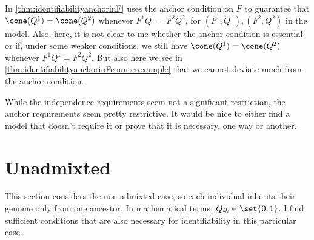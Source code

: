 \documentclass[12pt,a4paper]{article}
\begin{document}
 In \cref{thm:identifiabilityanchorinF} uses the anchor condition on $F$ to guarantee that $\cone(Q^1)=\cone(Q^2)$ whenever $F^1Q^1=F^2Q^2$, for $(F^1,Q^1),(F^2,Q^2)$ in the model. Also, here, it is not clear to me whether the anchor condition is essential or if, under some weaker conditions, we still have $\cone(Q^1)=\cone(Q^2)$ whenever $F^1Q^1=F^2Q^2$. But also here we see in \cref{thm:identifiabilityanchorinFcounterexample} that we cannot deviate much from the anchor condition. 

While the independence requirements seem not a significant restriction, the anchor requirements seem pretty restrictive. It would be nice to either find a model that doesn't require it or prove that it is necessary, one way or another. 





\section{Unadmixted}

This section considers the non-admixted case, so each individual inherits their genome only from one ancestor. In mathematical terms, $Q_{ik}\in \set{0,1}$. I find sufficient conditions that are also necessary for identifiability in this particular case. 
\end{document}
